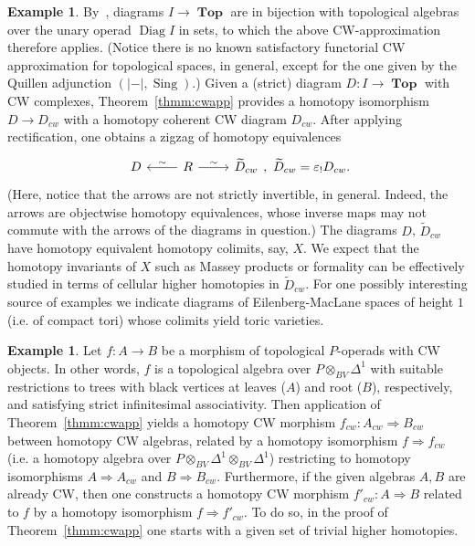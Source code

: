 \documentclass{amsart}
\theoremstyle{definition}
\newtheorem{example}[formula]{Example}
\theoremstyle{remark}
\newcommand{\eps}{\varepsilon}
\DeclareMathOperator{\Top}{\mathbf{Top}}
\DeclareMathOperator{\Sing}{Sing}
\DeclareMathOperator{\Diag}{Diag}
\begin{document}
	\begin{example}
		By~\cite{be-mo-06'}, diagrams  $I\to \Top$ are in bijection with topological algebras over the unary operad $\Diag I$ in sets, to which the above CW-approximation therefore applies.
		(Notice there is no known satisfactory functorial CW approximation for topological spaces, in general, except for the one given by the Quillen adjunction $(|-|,\Sing)$.) 				
		Given a (strict) diagram $D\colon I\to\Top$ with CW complexes, Theorem~\ref{thmm:cwapp} provides a homotopy isomorphism $D\to D_{cw}$ with a homotopy coherent CW diagram $D_{cw}$.
		After applying rectification, one obtains a zigzag of homotopy equivalences
		\[
		\begin{tikzcd}
			D & 		R\arrow[swap]{l}{\sim}\arrow{r}{\sim} & \widetilde{D}_{cw}
		\end{tikzcd},\ 
		\widetilde{D}_{cw}=\eps_{!}D_{cw}.
		\]
		(Here, notice that the arrows are not strictly invertible, in general. 
		Indeed, the arrows are objectwise homotopy equivalences, whose inverse maps may not commute with the arrows of the diagrams in question.)
		The diagrams $D$, $\widetilde{D}_{cw}$ have homotopy equivalent homotopy colimits, say, $X$.
		We expect that the homotopy invariants of $X$ such as Massey products or formality can be effectively studied in terms of cellular higher homotopies in $\widetilde{D}_{cw}$.
		For one possibly interesting source of examples we indicate diagrams of Eilenberg-MacLane spaces of height $1$ (i.e. of compact tori) whose colimits yield toric varieties. 
	\end{example}	
	
	\begin{example}
		Let $f\colon A\to B$ be a morphism of topological $P$-operads with CW objects.
		In other words, $f$ is a topological algebra over $P\otimes_{BV} \Delta^{1}$ with suitable restrictions to trees with black vertices at leaves ($A$) and root ($B$), respectively, and satisfying strict infinitesimal associativity.
		Then application of Theorem~\ref{thmm:cwapp} yields a homotopy CW morphism $f_{cw}\colon A_{cw}\Rightarrow B_{cw}$ between homotopy CW algebras, related by a homotopy isomorphism $f\Rightarrow f_{cw}$ (i.e. a homotopy algebra over $P\otimes_{BV} \Delta^{1}\otimes_{BV} \Delta^{1}$) restricting to homotopy isomorphisms $A\Rightarrow A_{cw}$ and $B\Rightarrow B_{cw}$.
		Furthermore, if the given algebras $A,B$ are already CW, then one constructs a homotopy CW morphism $f'_{cw}\colon A\Rightarrow B$ related to $f$ by a homotopy isomorphism $f\Rightarrow f'_{cw}$.
		To do so, in the proof of Theorem~\ref{thmm:cwapp} one starts with a given set of trivial higher homotopies.
	\end{example}
\end{document}
